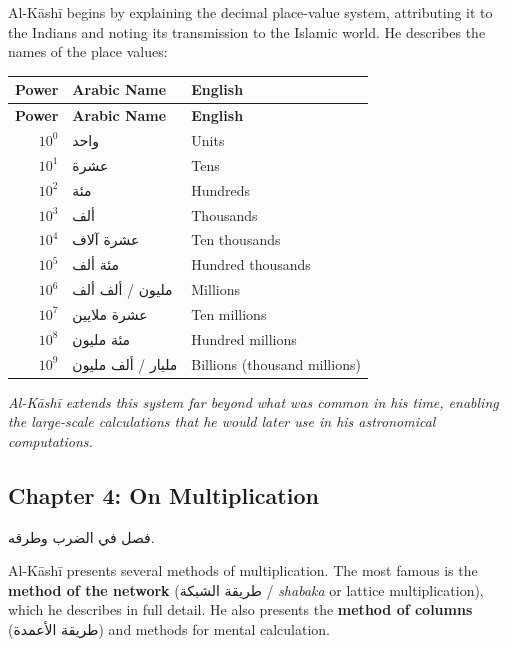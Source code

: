 \documentclass[11pt,a4paper]{article}
\newenvironment{arabicbox}{%
  \begin{framed}
  \begin{minipage}{\linewidth-2\fboxsep-2\fboxrule}
  \setlength{\parindent}{0pt}
  \linespread{1.3}\selectfont
}{%
  \end{minipage}
  \end{framed}
}
\newcommand{\cnote}[1]{\textcolor{notecolor}{\textit{#1}}}
\newcommand{\ar}[1]{{\arabicfont\beginR #1\endR}}
\begin{document}
\vspace{0.3cm}

Al-K\=ash\=i begins by explaining the decimal place-value system, attributing
it to the Indians and noting its transmission to the Islamic world. He
describes the names of the place values:

\begin{longtable}{|r|l|l|}
\hline
\textbf{Power} & \textbf{Arabic Name} & \textbf{English} \\
\hline
\endfirsthead
\hline
\textbf{Power} & \textbf{Arabic Name} & \textbf{English} \\
\hline
\endhead
$10^0$ & \ar{واحد} & Units \\
\hline
$10^1$ & \ar{عشرة} & Tens \\
\hline
$10^2$ & \ar{مئة} & Hundreds \\
\hline
$10^3$ & \ar{ألف} & Thousands \\
\hline
$10^4$ & \ar{عشرة آلاف} & Ten thousands \\
\hline
$10^5$ & \ar{مئة ألف} & Hundred thousands \\
\hline
$10^6$ & \ar{مليون} / \ar{ألف ألف} & Millions \\
\hline
$10^7$ & \ar{عشرة ملايين} & Ten millions \\
\hline
$10^8$ & \ar{مئة مليون} & Hundred millions \\
\hline
$10^9$ & \ar{مليار} / \ar{ألف مليون} & Billions (thousand millions) \\
\hline
\end{longtable}

\cnote{Al-K\=ash\=i extends this system far beyond what was common in his
time, enabling the large-scale calculations that he would later use in
his astronomical computations.}

\subsection{Chapter 4: On Multiplication}

\begin{arabicbox}
\begin{Arabic}
فصل في الضرب وطرقه.
\end{Arabic}
\end{arabicbox}

\vspace{0.3cm}

Al-K\=ash\=i presents several methods of multiplication. The most famous is
the \textbf{method of the network} (\ar{طريقة الشبكة} /
\textit{shabaka} or lattice multiplication), which he describes in full
detail. He also presents the \textbf{method of columns}
(\ar{طريقة الأعمدة}) and methods for mental calculation.
\end{document}
